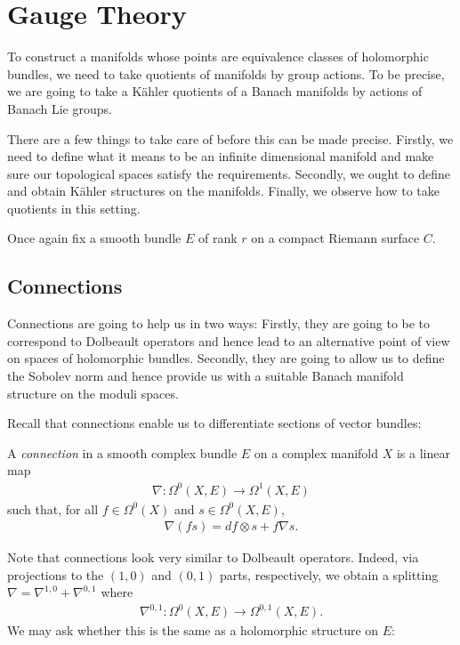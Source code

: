 \documentclass[12pt]{ociamthesis}  %
\begin{document}
\section{Gauge Theory}

To construct a manifolds whose points are equivalence classes of
holomorphic bundles, we need to take quotients of manifolds by
group actions. To be precise, we are going to take a K\"ahler
quotients of a Banach manifolds by actions of Banach Lie groups.

There are a few things to take care of before this can be made
precise. Firstly, we need to define what it means to be an infinite
dimensional manifold and make sure our topological spaces satisfy
the requirements. Secondly, we ought to define and obtain K\"ahler
structures on the manifolds. Finally, we observe how to take quotients
in this setting.

Once again fix a smooth bundle $E$ of rank $r$ on a compact
Riemann surface $C$.

\subsection{Connections}

Connections are going to help us in two ways: Firstly, they are going to
be to correspond to Dolbeault operators and hence lead to an
alternative point of view on spaces of holomorphic bundles.
Secondly, they are going to allow us to define the Sobolev norm and
hence provide us with a suitable Banach manifold structure on
the moduli spaces.

Recall that connections enable us to differentiate sections of
vector bundles:

\begin{definition}
  A \emph{connection} in a smooth complex bundle $E$ on
  a complex manifold $X$ is a linear map
  \begin{align*}
    \nabla : \Omega^0(X,E) \to \Omega^1(X,E)
  \end{align*}
  such that, for all $f\in \Omega^0(X)$ and $s\in\Omega^0(X,E)$,
  \begin{align*}
    \nabla (fs) = df \otimes s + f\nabla s.
  \end{align*}
\end{definition}

Note that connections look very similar to Dolbeault operators.
Indeed, via projections to the $(1,0)$ and $(0,1)$ parts, respectively,
we obtain a splitting $\nabla = \nabla^{1,0} + \nabla^{0,1}$
where
\begin{align*}
  \nabla^{0,1} : \Omega^0(X,E) \to \Omega^{0,1}(X,E).
\end{align*}
We may ask whether this is the same as a holomorphic structure on $E$:
\end{document}
